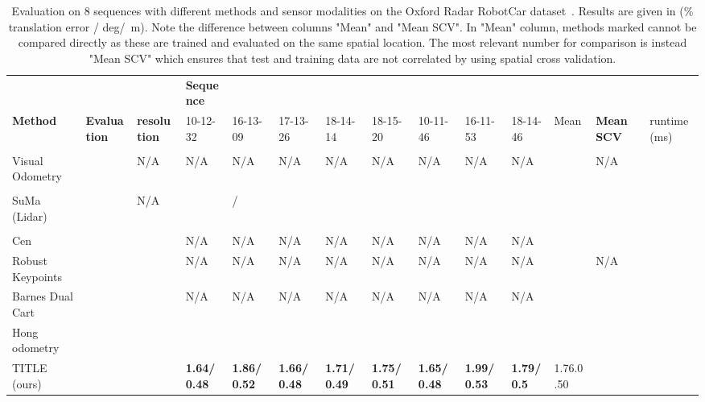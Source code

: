 \begin{table*}
\centering
  \begin{adjustbox}{width=\textwidth}

\begin{tabular}{l|ll|lllllllll|l|l}
              & & & \multicolumn{1}{l}{\textbf{Sequence}}    &                                                                        \\
\textbf{Method} & \textbf{Evaluation} & \textbf{resolution}        & 10-12-32 & 16-13-09 & 17-13-26 & 18-14-14 & 18-15-20 & 10-11-46 & 16-11-53 & 18-14-46 & Mean  & \textbf{Mean SCV} & runtime (ms)   \\
\hline \\
Visual Odometry  ~\cite{Churchill2012ExperienceBN} & ~\cite{barnes_masking_2020} & N/A   & N/A        & N/A        & N/A        & N/A        & N/A        & N/A        & N/A        & N/A        &     & N/A   &      \\
\hline \\
SuMa (Lidar)~\cite{behley2018rss}  & ~\cite{hong2020radarslam }& N/A  &  & / &  &  &   &         &         &         &     &   &       \\
\hline \\
Cen~\cite{8460687}    &   ~\cite{barnes_masking_2020} & & N/A        & N/A        & N/A        & N/A        & N/A        & N/A        & N/A        & N/A        &     &  &        \\
Robust Keypoints~\cite{barnes_under_2020}    &  &     & N/A        & N/A        & N/A        & N/A        & N/A        & N/A        & N/A        & N/A        &     & N/A  &         \\
Barnes Dual Cart~\cite{barnes_masking_2020} & &  & N/A        & N/A        & N/A        & N/A        & N/A        & N/A        & N/A        & N/A        &     &    &\\
Hong odometry~\cite{hong2020radarslam} & & &         &         &         &         &         &         &         &         &     &  &        \\
\ac{TITLE} (ours) &  &  & \textbf{1.64/0.48}          & \textbf{1.86/0.52}        & \textbf{1.66/0.48}        & \textbf{1.71/0.49}        & \textbf{1.75/0.51}        & \textbf{1.65/0.48}        & \textbf{1.99/0.53}        & \textbf{1.79/0.5}        & 
1.76.0.50    & 
  &  
\end{tabular}
  \end{adjustbox}

\caption{Evaluation on 8 sequences with different methods and sensor modalities on the Oxford Radar RobotCar dataset~\cite{RadarRobotCarDatasetICRA2020}.  Results are given in (\% translation error / deg/~m). Note the difference between columns "Mean" and "Mean SCV". In "Mean" column, methods marked  cannot be compared directly as these are trained and evaluated on the same spatial location. The most relevant number for comparison is instead "Mean SCV" which ensures that test and training data are not correlated by using spatial cross validation. 
}
\label{tab:results}
\vspace{-0.2cm}
\end{table*}
